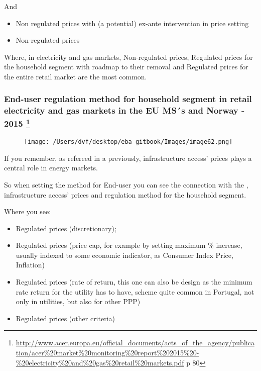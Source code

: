 \documentclass[]{book}
\providecommand{\tightlist}{%
  \setlength{\itemsep}{0pt}\setlength{\parskip}{0pt}}
\let\rmarkdownfootnote\footnote%
\def\footnote{\protect\rmarkdownfootnote}
\theoremstyle{definition}
\theoremstyle{definition}
\theoremstyle{definition}
\theoremstyle{remark}
\begin{document}
And

\begin{itemize}
\tightlist
\item
  Non regulated prices with (a potential) ex-ante intervention in price
  setting
\item
  Non-regulated prices
\end{itemize}

Where, in electricity and gas markets, Non-regulated prices, Regulated
prices for the household segment with roadmap to their removal and
Regulated prices for the entire retail market are the most common.

\subsubsection[End-user regulation method for household segment in
retail electricity and gas markets in the EU MS´s and Norway - 2015
]{\texorpdfstring{End-user regulation method for household segment in
retail electricity and gas markets in the EU MS´s and Norway - 2015
\footnote{\url{http://www.acer.europa.eu/official_documents/acts_of_the_agency/publication/acer\%20market\%20monitoring\%20report\%202015\%20-\%20electricity\%20and\%20gas\%20retail\%20markets.pdf}
  p 80}}{End-user regulation method for household segment in retail electricity and gas markets in the EU MS´s and Norway - 2015 }}\label{end-user-regulation-method-for-household-segment-in-retail-electricity-and-gas-markets-in-the-eu-mss-and-norway---2015-16}

\begin{figure}[htbp]
\centering
\texttt{[image: /Users/dvf/desktop/eba gitbook/Images/image62.png]}
\caption{}
\end{figure}

If you remember, as refereed in a previously, infrastructure access'
prices plays a central role in energy markets.

So when setting the method for End-user you can see the connection with
the , infrastructure access' prices and regulation method for the
household segment.

Where you see:

\begin{itemize}
\tightlist
\item
  Regulated prices (discretionary);
\item
  Regulated prices (price cap, for example by setting maximum \%
  increase, usually indexed to some economic indicator, as Consumer
  Index Price, Inflation)
\item
  Regulated prices (rate of return, this one can also be design as the
  minimum rate return for the utility has to have, scheme quite common
  in Portugal, not only in utilities, but also for other PPP)
\item
  Regulated prices (other criteria)
\end{itemize}
\end{document}
